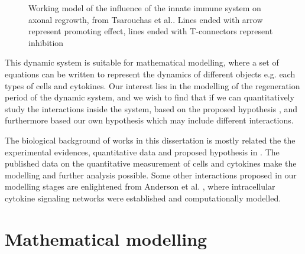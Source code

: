 \begin{figure}[t]
    \begin{center}
    \end{center}

    \caption[Working model of the influence of the innate immune system on axonal regrowth]%
    {Working model of the influence of the innate immune system on axonal regrowth, from Tsarouchas et al.\cite{ref:Tsarouchas}. Lines ended with arrow represent promoting effect, lines ended with T-connectors represent inhibition}
    \label{fig:map}

\end{figure}

This dynamic system is suitable for mathematical modelling, where a set of equations can be written to represent the dynamics of different objects e.g. each types of cells and cytokines. Our interest lies in the modelling of the regeneration period of the dynamic system, and we wish to find that if we can quantitatively study the interactions inside the system, based on the proposed hypothesis \cite{ref:Tsarouchas}, and furthermore based our own hypothesis which may include different interactions.

The biological background of works in this dissertation is mostly related the the experimental evidences, quantitative data and proposed hypothesis in \cite{ref:Tsarouchas}. The published data on the quantitative measurement of cells and cytokines make the modelling and further analysis possible. Some other interactions proposed in our modelling stages are enlightened from Anderson et al. \cite{Anderson}, where intracellular cytokine signaling networks were established and computationally modelled.

\section{Mathematical modelling}


